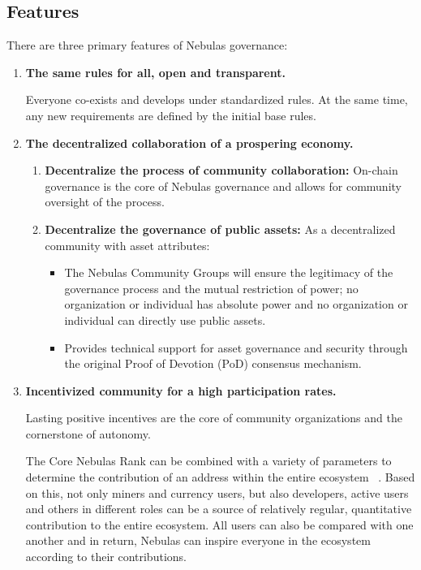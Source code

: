 \subsection{Features}

There are three primary features of Nebulas governance:

\begin{enumerate}
	\item 

	\textbf{The same rules for all, open and transparent.} 

	Everyone co-exists and develops under standardized rules. At the same time, any new requirements are defined by the initial base rules.

	\item 

\textbf{The decentralized collaboration of a prospering economy.}


	\begin{enumerate}
		\item 

		\textbf{Decentralize the process of community collaboration:} On-chain governance is the core of Nebulas governance and allows for community oversight of the process.
		
		\item 

		\textbf{Decentralize the governance of public assets:} As a decentralized community with asset attributes:

		\begin{itemize}
			\item The Nebulas Community Groups will ensure the legitimacy of the governance process and the mutual restriction of power; no organization or individual has absolute power and no organization or individual can directly use public assets.
			\item Provides technical support for asset governance and security through the original Proof of Devotion (PoD) consensus mechanism.
		\end{itemize}

	\end{enumerate}

	\item 

	\textbf{Incentivized community for a high participation rates.}
	
	Lasting positive incentives are the core of community organizations and the cornerstone of autonomy.

	The Core Nebulas Rank can be combined with a variety of parameters to determine the contribution of an address within the entire ecosystem ~\cite{yellowpaper}. Based on this, not only miners and currency users, but also developers, active users and others in different roles can be a source of relatively regular, quantitative contribution to the entire ecosystem. All users can also be compared with one another and in return, Nebulas can inspire everyone in the ecosystem according to their contributions.


\end{enumerate}

